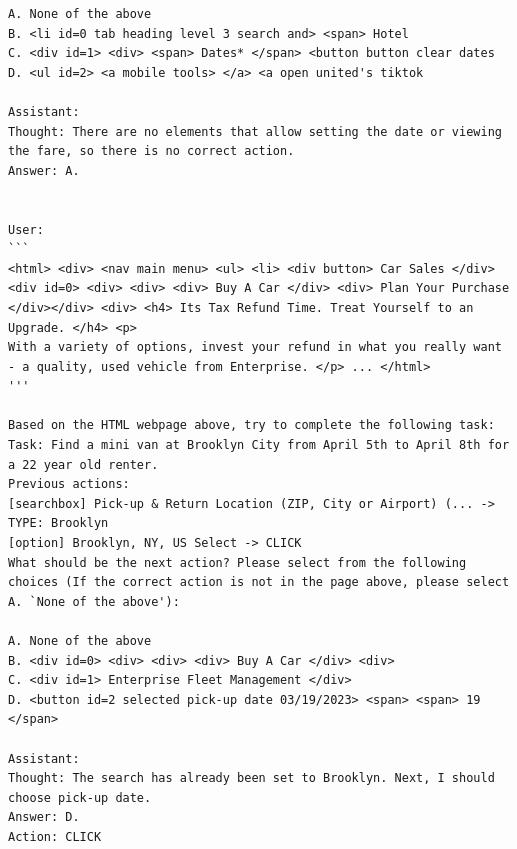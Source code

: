 \begin{lstlisting}
A. None of the above
B. <li id=0 tab heading level 3 search and> <span> Hotel
C. <div id=1> <div> <span> Dates* </span> <button button clear dates
D. <ul id=2> <a mobile tools> </a> <a open united's tiktok

Assistant:
Thought: There are no elements that allow setting the date or viewing the fare, so there is no correct action.
Answer: A.


User:
```
<html> <div> <nav main menu> <ul> <li> <div button> Car Sales </div> <div id=0> <div> <div> <div> Buy A Car </div> <div> Plan Your Purchase </div></div> <div> <h4> Its Tax Refund Time. Treat Yourself to an Upgrade. </h4> <p>
With a variety of options, invest your refund in what you really want - a quality, used vehicle from Enterprise. </p> ... </html>
'''

Based on the HTML webpage above, try to complete the following task:
Task: Find a mini van at Brooklyn City from April 5th to April 8th for a 22 year old renter.
Previous actions:
[searchbox] Pick-up & Return Location (ZIP, City or Airport) (... -> TYPE: Brooklyn
[option] Brooklyn, NY, US Select -> CLICK
What should be the next action? Please select from the following choices (If the correct action is not in the page above, please select A. `None of the above'):

A. None of the above
B. <div id=0> <div> <div> <div> Buy A Car </div> <div>
C. <div id=1> Enterprise Fleet Management </div>
D. <button id=2 selected pick-up date 03/19/2023> <span> <span> 19 </span>

Assistant:
Thought: The search has already been set to Brooklyn. Next, I should choose pick-up date.
Answer: D.
Action: CLICK



\end{lstlisting}
